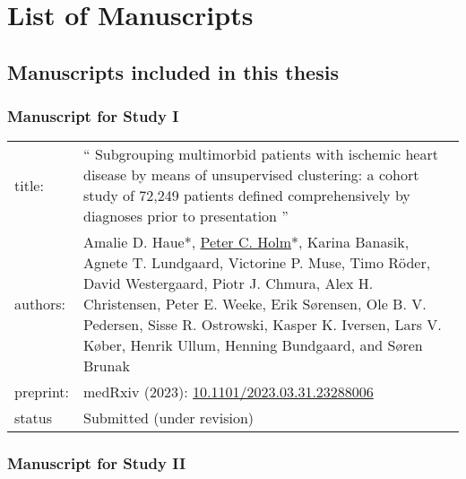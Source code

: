 \chapter*{List of Manuscripts}
\section*{Manuscripts included in this thesis}


\subsection*{Manuscript for Study I}

{\small
\begin{tabularx}{\textwidth}{lX}
    title: & 
    \enquote{%
        Subgrouping multimorbid patients with ischemic heart disease 
        by means of unsupervised clustering: 
        a cohort study of 72,249 patients 
        defined comprehensively by diagnoses prior to presentation%
    } \\
    authors: &
    \raggedright\arraybackslash
    Amalie D. Haue*, \underline{Peter C. Holm}*,
    Karina Banasik, Agnete T. Lundgaard, Victorine P. Muse, Timo Röder, 
    David Westergaard, Piotr J. Chmura, Alex H. Christensen, Peter E. Weeke, 
    Erik Sørensen, Ole B. V. Pedersen, Sisse R. Ostrowski, Kasper K. Iversen, 
    Lars V.  Køber, Henrik Ullum, Henning Bundgaard, 
    and Søren Brunak \\
    preprint: & medRxiv (2023):
    \href{https://doi.org/10.1101/2023.03.31.23288006}%
         {10.1101/2023.03.31.23288006} \\
    status & Submitted (under revision)
\end{tabularx}
}

\subsection*{Manuscript for Study II}

